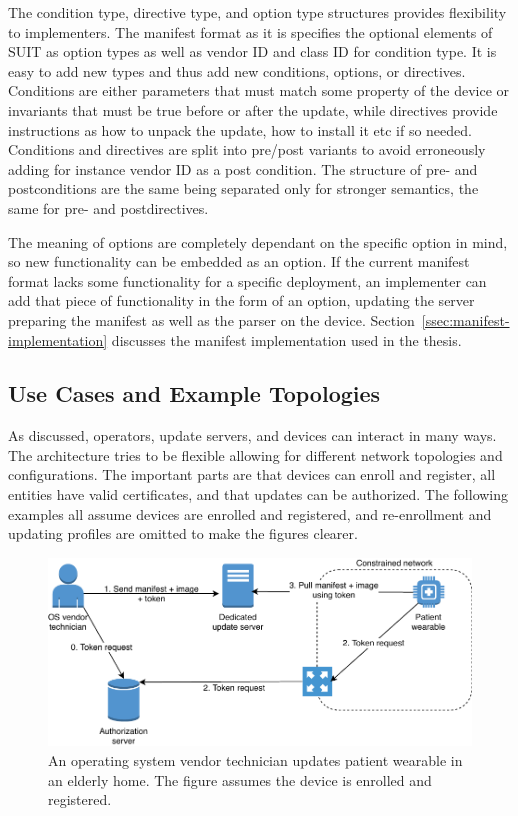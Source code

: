 \documentclass[0-thesis.tex]{subfiles}
\begin{document}
The condition type, directive type, and option type structures provides flexibility to
implementers. The manifest format as it is specifies the optional elements of SUIT as
option types as well as vendor ID and class ID for condition type. It is easy to add new
types and thus add new conditions, options, or directives. Conditions are either
parameters that must match some property of the device or invariants that must be true
before or after the update, while directives provide instructions as how to unpack the
update, how to install it etc if so needed. Conditions and directives are split into
pre/post variants to avoid erroneously adding for instance vendor ID as a post condition.
The structure of pre- and postconditions are the same being separated only for stronger
semantics, the same for pre- and postdirectives.

The meaning of options are completely dependant on the specific option in mind, so new
functionality can be embedded as an option. If the current manifest format lacks some
functionality for a specific deployment, an implementer can add that piece of
functionality in the form of an option, updating the server preparing the manifest as well
as the parser on the device. Section~\ref{ssec:manifest-implementation} discusses the
manifest implementation used in the thesis.

\subsection{Use Cases and Example Topologies}
\label{ssec:use-cases-examples-topologies}
As discussed, operators, update servers, and devices can interact in many ways. The
architecture tries to be flexible allowing for different network topologies and
configurations. The important parts are that devices can enroll and register, all entities
have valid certificates, and that updates can be authorized. The following examples all
assume devices are enrolled and registered, and re-enrollment and updating profiles are
omitted to make the figures clearer.

\begin{figure}[t]
    \caption{An operating system vendor technician updates patient wearable in an elderly home. The figure assumes the device is enrolled and registered.}
    \label{fig:elderly-home}
    \includegraphics{images/use-case-elderly-home.pdf}
\end{figure}
\end{document}
